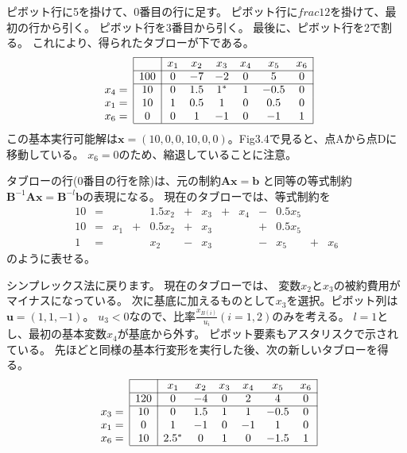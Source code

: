 \documentclass{jsarticle}
\begin{document}
ピボット行に5を掛けて、0番目の行に足す。
ピボット行に$frac{1}{2}$を掛けて、最初の行から引く。 
ピボット行を3番目から引く。
最後に、ピボット行を2で割る。
これにより、得られたタブローが下である。
\begin{equation}
  \begin{array}{c|c|cccccc|}
    \cline{2-8} 
    && x_{1} & x_{2} & x_{3} & x_{4} & x_{5} & x_{6} \\
    \cline{2-8}   
    &100 & 0 & -7 & -2 & 0 & 5 & 0 \\
    \cline{2-8} 
    x_4=&10&0 & 1.5 & 1^* & 1 & -0.5 & 0 \\
    x_1=&10&1 & 0.5 & 1 & 0 & 0.5 & 0 \\
    x_6=&0 & 0 & 1 & -1 & 0 & -1 & 1 \\
    \cline{2-8} 
  \end{array}
\end{equation}
この基本実行可能解は$\bm{x}=(10,0,0,10,0,0)$。Fig3.4で見ると、点Aから点Dに移動している。
$x_6=0$のため、縮退していることに注意。

タブローの行(0番目の行を除)は、元の制約$\bm{Ax}=\bm{b}$
と同等の等式制約$\bm{B}^{-1}\bm{Ax}=\bm{B}^{-l}\bm{b}$の表現になる。
現在のタブローでは、等式制約を
\begin{equation}
  \begin{array}{ccccccccccccc}
  10&=&&&1.5x_2&+&x_3&+&x_4&-&0.5x_5&&\\
  10&=&x_1&+&0.5x_2&+&x_3&&&+&0.5x_5&&\\
  1&=&&&x_2&-&x_3&&&-&x_5&+&x_6
  \end{array}
\end{equation}
のように表せる。

シンプレックス法に戻ります。 現在のタブローでは、
変数$x_2$と$x_3$の被約費用がマイナスになっている。
次に基底に加えるものとして$x_3$を選択。ピボット列は$\bm{u}=(1,1,-1)$。
$u_3<0$なので、比率$\frac{x_{B(i)}}{u_i}(i=1,2)$のみを考える。
$l = 1$とし、最初の基本変数$x_4$が基底から外す。
ピボット要素もアスタリスクで示されている。
先ほどと同様の基本行変形を実行した後、次の新しいタブローを得る。
\begin{equation}
  \begin{array}{c|c|cccccc|}
    \cline{2-8} 
    && x_{1} & x_{2} & x_{3} & x_{4} & x_{5} & x_{6} \\
    \cline{2-8}   
    &120 & 0 & -4 & 0 & 2 & 4 & 0 \\
    \cline{2-8} 
    x_3=&10&0 & 1.5 & 1 & 1 & -0.5 & 0 \\
    x_1=&0&1 & -1 & 0 & -1 & 1 & 0 \\
    x_6=&10 & 2.5^* & 0 & 1 & 0 & -1.5 & 1 \\
    \cline{2-8} 
  \end{array}
\end{equation}
\end{document}
